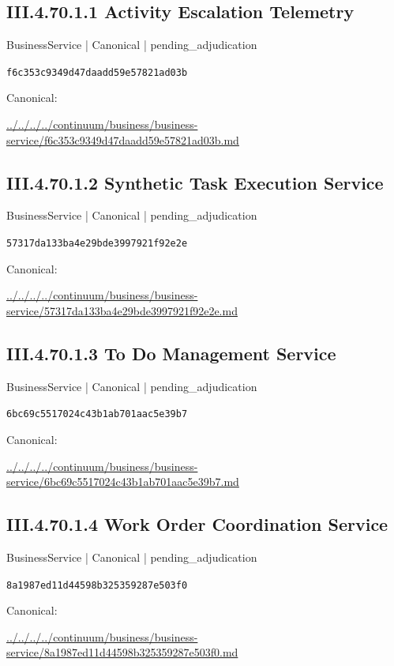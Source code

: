\documentclass[10pt,a4paper]{article}
\begin{document}
\subsection*{III.4.70.1.1 Activity Escalation Telemetry}
{\small BusinessService | Canonical | pending\_adjudication}\par
\texttt{f6c353c9349d47daadd59e57821ad03b}\par
Canonical: \par
{\footnotesize\url{../../../../continuum/business/business-service/f6c353c9349d47daadd59e57821ad03b.md}}\par
\subsection*{III.4.70.1.2 Synthetic Task Execution Service}
{\small BusinessService | Canonical | pending\_adjudication}\par
\texttt{57317da133ba4e29bde3997921f92e2e}\par
Canonical: \par
{\footnotesize\url{../../../../continuum/business/business-service/57317da133ba4e29bde3997921f92e2e.md}}\par
\subsection*{III.4.70.1.3 To Do Management Service}
{\small BusinessService | Canonical | pending\_adjudication}\par
\texttt{6bc69c5517024c43b1ab701aac5e39b7}\par
Canonical: \par
{\footnotesize\url{../../../../continuum/business/business-service/6bc69c5517024c43b1ab701aac5e39b7.md}}\par
\subsection*{III.4.70.1.4 Work Order Coordination Service}
{\small BusinessService | Canonical | pending\_adjudication}\par
\texttt{8a1987ed11d44598b325359287e503f0}\par
Canonical: \par
{\footnotesize\url{../../../../continuum/business/business-service/8a1987ed11d44598b325359287e503f0.md}}\par
\end{document}
